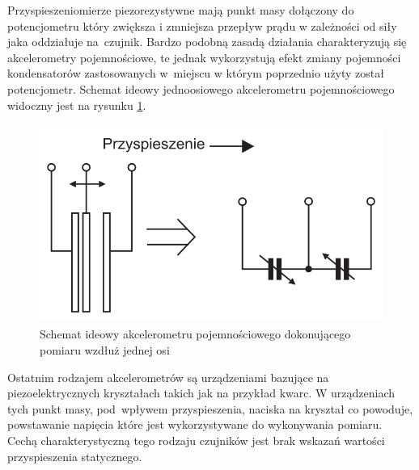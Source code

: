 Przyspieszeniomierze piezorezystywne mają punkt masy dołączony do potencjometru
który zwiększa i zmniejsza przepływ prądu w zależności od siły jaka oddziałuje
na~czujnik. Bardzo podobną zasadą działania charakteryzują się akcelerometry
pojemnościowe, te jednak wykorzystują efekt zmiany pojemności kondensatorów
zastosowanych w~miejscu w którym poprzednio użyty został potencjometr. Schemat
ideowy jednoosiowego akcelerometru pojemnościowego widoczny jest na rysunku
\ref{fig:AkcelerometrIdeowyScheamt}.
\newpage
\begin{figure}[h!]
 \centering
 \includegraphics[height=65mm]{../images/ch04/acc_intro.png}
 \caption{Schemat ideowy akcelerometru pojemnościowego dokonującego pomiaru
 wzdłuż jednej osi\cite{ElektronikaPraktyczna22010}}
 \label{fig:AkcelerometrIdeowyScheamt}
\end{figure} 
Ostatnim rodzajem akcelerometrów są urządzeniami bazujące na piezoelektrycznych kryształach takich jak na przykład kwarc. W urządzeniach tych punkt masy, pod~wpływem
przyspieszenia, naciska na kryształ co powoduje, powstawanie napięcia które
jest wykorzystywane do wykonywania pomiaru. Cechą charakterystyczną tego rodzaju
czujników jest brak wskazań wartości przyspieszenia
statycznego\cite{website:elektronikab2b-platforma-bezzalogowa}.
